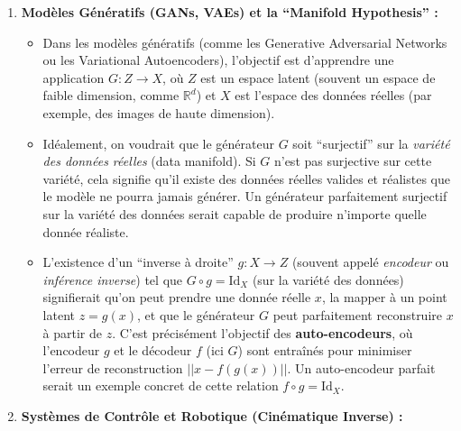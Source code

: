 \documentclass[12pt,a4paper]{report}
\providecommand{\tightlist}{%
  \setlength{\itemsep}{0pt}\setlength{\parskip}{0pt}}
\begin{document}
\begin{enumerate}
\def\labelenumi{\arabic{enumi}.}
\tightlist
\item
  \textbf{Modèles Génératifs (GANs, VAEs) et la ``Manifold Hypothesis''
  :}

  \begin{itemize}
  \tightlist
  \item
    Dans les modèles génératifs (comme les Generative Adversarial
    Networks ou les Variational Autoencoders), l'objectif est
    d'apprendre une application \(G: Z \to X\), où \(Z\) est un espace
    latent (souvent un espace de faible dimension, comme
    \(\mathbb{R}^d\)) et \(X\) est l'espace des données réelles (par
    exemple, des images de haute dimension).
  \item
    Idéalement, on voudrait que le générateur \(G\) soit ``surjectif''
    sur la \emph{variété des données réelles} (data manifold). Si \(G\)
    n'est pas surjective sur cette variété, cela signifie qu'il existe
    des données réelles valides et réalistes que le modèle ne pourra
    jamais générer. Un générateur parfaitement surjectif sur la variété
    des données serait capable de produire n'importe quelle donnée
    réaliste.
  \item
    L'existence d'un ``inverse à droite'' \(g: X \to Z\) (souvent appelé
    \emph{encodeur} ou \emph{inférence inverse}) tel que
    \(G \circ g = \text{Id}_X\) (sur la variété des données)
    signifierait qu'on peut prendre une donnée réelle \(x\), la mapper à
    un point latent \(z=g(x)\), et que le générateur \(G\) peut
    parfaitement reconstruire \(x\) à partir de \(z\). C'est précisément
    l'objectif des \textbf{auto-encodeurs}, où l'encodeur \(g\) et le
    décodeur \(f\) (ici \(G\)) sont entraînés pour minimiser l'erreur de
    reconstruction \(||x - f(g(x))||\). Un auto-encodeur parfait serait
    un exemple concret de cette relation \(f \circ g = \text{Id}_X\).
  \end{itemize}
\item
  \textbf{Systèmes de Contrôle et Robotique (Cinématique Inverse) :}


\end{enumerate}
\end{document}
